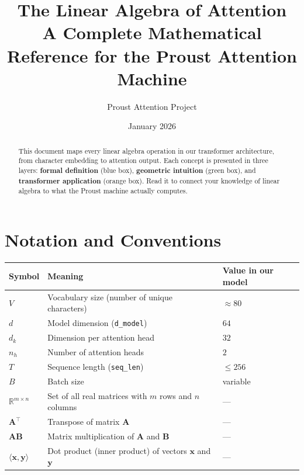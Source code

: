 \documentclass[11pt, a4paper]{article}
\title{\textbf{The Linear Algebra of Attention} \\[0.5em]
\large A Complete Mathematical Reference for the Proust Attention Machine}
\author{Proust Attention Project}
\date{January 2026}
\newcommand{\R}{\mathbb{R}}
\newcommand{\vx}{\bm{x}}
\begin{document}
\maketitle

\begin{abstract}
This document maps every linear algebra operation in our transformer architecture,
from character embedding to attention output. Each concept is presented in three layers:
\textbf{formal definition} (blue box), \textbf{geometric intuition} (green box),
and \textbf{transformer application} (orange box). Read it to connect your knowledge
of linear algebra to what the Proust machine actually computes.
\end{abstract}

\tableofcontents
\newpage

\section{Notation and Conventions}

\begin{formaldef}
\begin{tabular}{@{}lll@{}}
\toprule
\textbf{Symbol} & \textbf{Meaning} & \textbf{Value in our model} \\
\midrule
$V$ & Vocabulary size (number of unique characters) & $\approx 80$ \\
$d$ & Model dimension (\texttt{d\_model}) & $64$ \\
$d_k$ & Dimension per attention head & $32$ \\
$n_h$ & Number of attention heads & $2$ \\
$T$ & Sequence length (\texttt{seq\_len}) & $\leq 256$ \\
$B$ & Batch size & variable \\
$\R^{m \times n}$ & Set of all real matrices with $m$ rows and $n$ columns & --- \\
$\bm{A}^\top$ & Transpose of matrix $\bm{A}$ & --- \\
$\bm{A} \bm{B}$ & Matrix multiplication of $\bm{A}$ and $\bm{B}$ & --- \\
$\langle \vx, \bm{y} \rangle$ & Dot product (inner product) of vectors $\vx$ and $\bm{y}$ & --- \\
\bottomrule
\end{tabular}
\end{formaldef}
\end{document}
